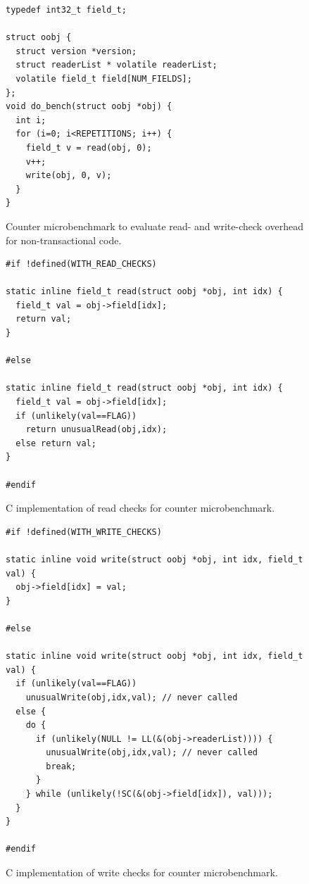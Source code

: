 \begin{figure}
\sis\fontsize{9}{10}\begin{verbatim}
typedef int32_t field_t;

struct oobj {
  struct version *version;
  struct readerList * volatile readerList;
  volatile field_t field[NUM_FIELDS];
};
void do_bench(struct oobj *obj) {
  int i;
  for (i=0; i<REPETITIONS; i++) {
    field_t v = read(obj, 0);
    v++;
    write(obj, 0, v);
  }
}
\end{verbatim}
\caption{Counter microbenchmark to evaluate read- and write-check
  overhead for non-transactional code.}
\label{fig:counter-bench}
\end{figure}

\begin{figure}
\sis\fontsize{9}{10}\begin{verbatim}
#if !defined(WITH_READ_CHECKS)

static inline field_t read(struct oobj *obj, int idx) {
  field_t val = obj->field[idx];
  return val;
}

#else

static inline field_t read(struct oobj *obj, int idx) {
  field_t val = obj->field[idx];
  if (unlikely(val==FLAG))
    return unusualRead(obj,idx);
  else return val;
}

#endif
\end{verbatim}
\caption{C implementation of read checks for counter microbenchmark.}
\label{fig:counter-read}
\end{figure}

\begin{figure}
\sis\fontsize{9}{10}\begin{verbatim}
#if !defined(WITH_WRITE_CHECKS)

static inline void write(struct oobj *obj, int idx, field_t val) {
  obj->field[idx] = val;
}

#else

static inline void write(struct oobj *obj, int idx, field_t val) {
  if (unlikely(val==FLAG))
    unusualWrite(obj,idx,val); // never called
  else {
    do {
      if (unlikely(NULL != LL(&(obj->readerList)))) {
        unusualWrite(obj,idx,val); // never called
        break;
      }
    } while (unlikely(!SC(&(obj->field[idx]), val)));
  }
}

#endif
\end{verbatim}
\caption{C implementation of write checks for counter microbenchmark.}
\label{fig:counter-write}
\end{figure}

